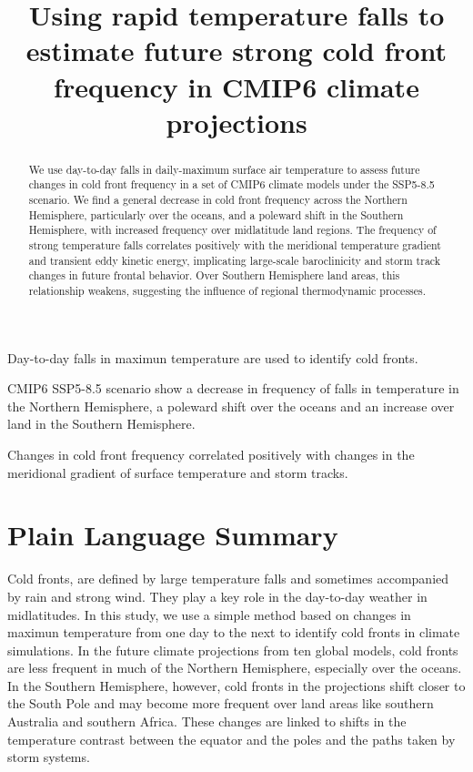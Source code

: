 \documentclass[
]{agujournal2019}
\begin{document}
\title{Using rapid temperature falls to estimate future strong cold
front frequency in CMIP6 climate projections}


\begin{keypoints}
\item Day-to-day falls in maximun temperature are used to identify cold
fronts. \item CMIP6 SSP5-8.5 scenario show a decrease in frequency of
falls in temperature in the Northern Hemisphere, a poleward shift over
the oceans and an increase over land in the Southern
Hemisphere. \item Changes in cold front frequency correlated positively
with changes in the meridional gradient of surface temperature and storm
tracks. 
\end{keypoints}

\begin{abstract}
We use day-to-day falls in daily-maximum surface air temperature to
assess future changes in cold front frequency in a set of CMIP6 climate
models under the SSP5-8.5 scenario. We find a general decrease in cold
front frequency across the Northern Hemisphere, particularly over the
oceans, and a poleward shift in the Southern Hemisphere, with increased
frequency over midlatitude land regions. The frequency of strong
temperature falls correlates positively with the meridional temperature
gradient and transient eddy kinetic energy, implicating large-scale
baroclinicity and storm track changes in future frontal behavior. Over
Southern Hemisphere land areas, this relationship weakens, suggesting
the influence of regional thermodynamic processes.
\end{abstract}

\section*{Plain Language Summary}
Cold fronts, are defined by large temperature falls and sometimes
accompanied by rain and strong wind. They play a key role in the
day-to-day weather in midlatitudes. In this study, we use a simple
method based on changes in maximun temperature from one day to the next
to identify cold fronts in climate simulations. In the future climate
projections from ten global models, cold fronts are less frequent in
much of the Northern Hemisphere, especially over the oceans. In the
Southern Hemisphere, however, cold fronts in the projections shift
closer to the South Pole and may become more frequent over land areas
like southern Australia and southern Africa. These changes are linked to
shifts in the temperature contrast between the equator and the poles and
the paths taken by storm systems.
\end{document}
